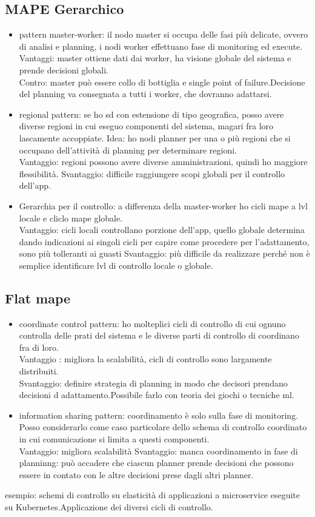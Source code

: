 \documentclass[16px]{article}
\begin{document}
\subsection{MAPE Gerarchico}
\begin{itemize}
\item pattern master-worker: 
il nodo master si occupa delle fasi più delicate, ovvero di analisi e planning, i nodi worker effettuano fase di monitoring ed execute.
Vantaggi: master ottiene dati dai worker, ha visione globale del sistema e prende decisioni globali.\\
Contro: master può essere collo di bottiglia e single point of failure.Decisione del planning va consegnata a tutti i worker, che dovranno adattarsi.
\item regional pattern: se ho sd con estensione di tipo geografica, posso avere diverse regioni in cui eseguo componenti del sistema, magari fra loro lascamente accoppiate. Idea: ho nodi planner per una o più regioni che si occupano dell'attività di planning per determinare regioni.\\
Vantaggio: regioni possono avere diverse amministrazioni, quindi ho maggiore flessibilità.
Svantaggio: difficile raggiungere scopi globali per il controllo dell'app.
\item Gerarchia per il controllo: a differenza della master-worker ho cicli mape a lvl locale e cliclo mape globale.\\
Vantaggio: cicli locali controllano porzione dell'app, quello globale determina dando indicazioni ai singoli cicli per capire come procedere per l'adattamento, sono più tolleranti ai guasti
Svantaggio: più difficile da realizzare perché non è semplice identificare lvl di controllo locale o globale.
\end{itemize}
\subsection{Flat mape}
\begin{itemize}
\item coordinate control pattern: ho molteplici cicli di controllo di cui ognuno controlla delle prati del sistema e le diverse parti di controllo di coordinano fra di loro.\\ Vantaggio : migliora la scalabilità, cicli di controllo sono largamente distribuiti.\\
Svantaggio: definire strategia di planning in modo che decisori prendano decisioni d adattamento.Possibile farlo con teoria dei giochi o tecniche ml.
\item information sharing pattern: coordinamento è solo sulla fase di monitoring. Posso considerarlo come caso particolare dello schema di controllo coordinato in cui comunicazione si limita a questi componenti.\\
Vantaggio: migliora scalabilità 
Svantaggio: manca coordinamento in fase di planninng: può accadere che ciascun planner prende decisioni che possono essere in contato con le altre decisioni prese dagli altri planner.
\end{itemize}
esempio: schemi di controllo su elasticità di applicazioni a microservice eseguite su Kubernetes.Applicazione dei diversi cicli di controllo.
\end{document}
